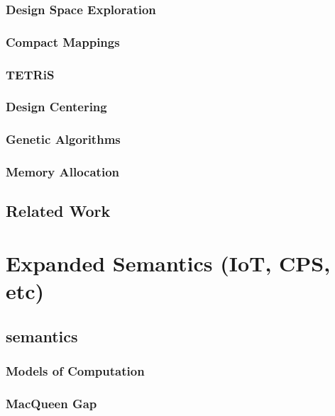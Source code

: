 \documentclass{report}
\begin{document}
\section{Design Space Exploration}
\section{Compact Mappings}
\section{TETRiS}
\section{Design Centering}
\section{Genetic Algorithms}
\section{Memory Allocation}

\chapter{Related Work}



\part{Expanded Semantics (IoT, CPS, etc)}


\chapter{semantics}

\section{Models of Computation}

\section{MacQueen Gap}
\end{document}
